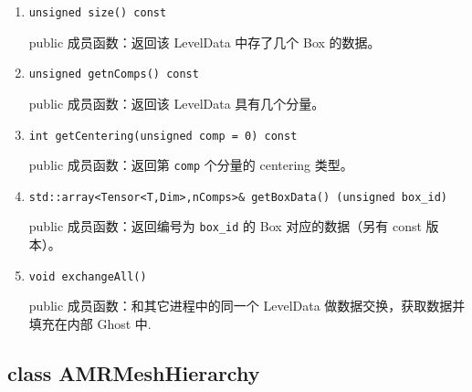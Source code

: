\documentclass[cn, bibend=bibtex]{elegantpaper}
\theoremstyle{plain}
\begin{document}
\begin{itemize}
\begin{enumerate}
    \item \lstinline|unsigned size() const|

    public 成员函数：返回该 LevelData 中存了几个 Box 的数据。

    \item \lstinline|unsigned getnComps() const|

    public 成员函数：返回该 LevelData 具有几个分量。

    \item \lstinline|int getCentering(unsigned comp = 0) const|

    public 成员函数：返回第 \lstinline|comp| 个分量的 centering 类型。

    \item \lstinline|std::array<Tensor<T,Dim>,nComps>& getBoxData() (unsigned box_id)|

    public 成员函数：返回编号为 \lstinline|box_id| 的 Box 对应的数据（另有 const 版本）。

    \item \lstinline|void exchangeAll()|

    public 成员函数：和其它进程中的同一个 LevelData 做数据交换，获取数据并填充在内部 Ghost 中.
  \end{enumerate} 
\end{itemize}

\subsection{class AMRMeshHierarchy}
\end{document}
